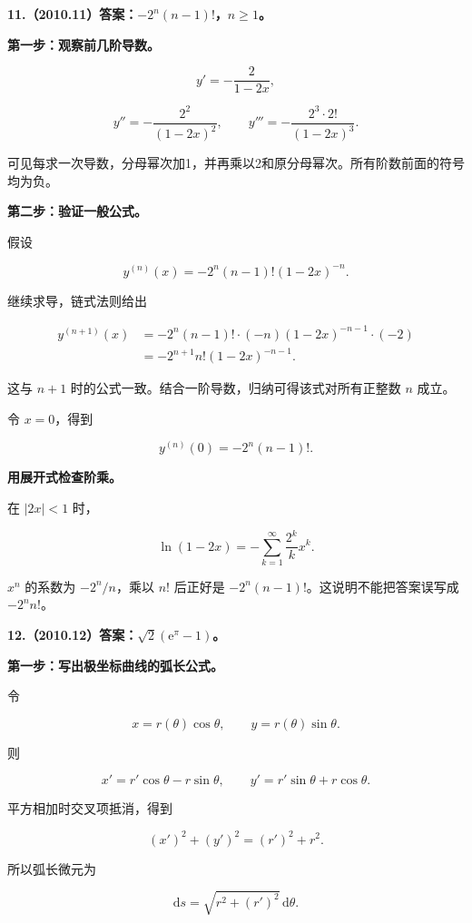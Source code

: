 \documentclass[UTF8,11pt,fontset=windows]{ctexart}
\begin{document}
\clearpage

\textbf{11.（2010.11）答案：$-2^n(n-1)!$，$n\ge1$。}

\textbf{第一步：观察前几阶导数。}

$$
y'=-\frac2{1-2x},
$$

$$
y''=-\frac{2^2}{(1-2x)^2},
\qquad y'''=-\frac{2^3\cdot2!}{(1-2x)^3}.
$$

可见每求一次导数，分母幂次加1，并再乘以2和原分母幂次。所有阶数前面的符号均为负。

\textbf{第二步：验证一般公式。}

假设

$$
y^{(n)}(x)=-2^n(n-1)!(1-2x)^{-n}.
$$

继续求导，链式法则给出

$$
\begin{aligned}
y^{(n+1)}(x)
&=-2^n(n-1)!\cdot(-n)(1-2x)^{-n-1}\cdot(-2)\\
&=-2^{n+1}n!(1-2x)^{-n-1}.
\end{aligned}
$$

这与 $n+1$ 时的公式一致。结合一阶导数，归纳可得该式对所有正整数 $n$ 成立。

令 $x=0$，得到

$$
\boxed{y^{(n)}(0)=-2^n(n-1)!}.
$$

\textbf{用展开式检查阶乘。}

在 $|2x|<1$ 时，

$$
\ln(1-2x)=-\sum_{k=1}^{\infty}\frac{2^k}{k}x^k.
$$

$x^n$ 的系数为 $-2^n/n$，乘以 $n!$ 后正好是 $-2^n(n-1)!$。这说明不能把答案误写成 $-2^nn!$。

\clearpage

\textbf{12.（2010.12）答案：$\sqrt2(\mathrm e^\pi-1)$。}

\textbf{第一步：写出极坐标曲线的弧长公式。}

令

$$
x=r(\theta)\cos\theta,\qquad y=r(\theta)\sin\theta.
$$

则

$$
x'=r'\cos\theta-r\sin\theta,
\qquad y'=r'\sin\theta+r\cos\theta.
$$

平方相加时交叉项抵消，得到

$$
(x')^2+(y')^2=(r')^2+r^2.
$$

所以弧长微元为

$$
\mathrm ds=\sqrt{r^2+(r')^2}\,\mathrm d\theta.
$$
\end{document}
